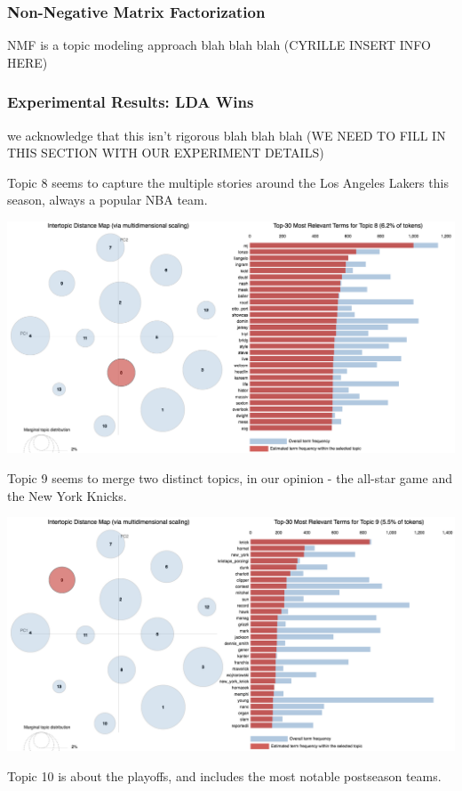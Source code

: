 \documentclass[11pt]{article}
\begin{document}
\subsubsection{Non-Negative Matrix Factorization}
NMF is a topic modeling approach blah blah blah
(CYRILLE INSERT INFO HERE)

\subsubsection{Experimental Results: LDA Wins}
we acknowledge that this isn't rigorous blah blah blah
(WE NEED TO FILL IN THIS SECTION WITH OUR EXPERIMENT DETAILS)


Topic 8 seems to capture the multiple stories around the Los Angeles Lakers this season, always a popular NBA team. 

\includegraphics[width=470pt]{8.png} 

Topic 9 seems to merge two distinct topics, in our opinion - the all-star game and the New York Knicks. 

\includegraphics[width=470pt]{9.png} 

Topic 10 is about the playoffs, and includes the most notable postseason teams. 
\end{document}
